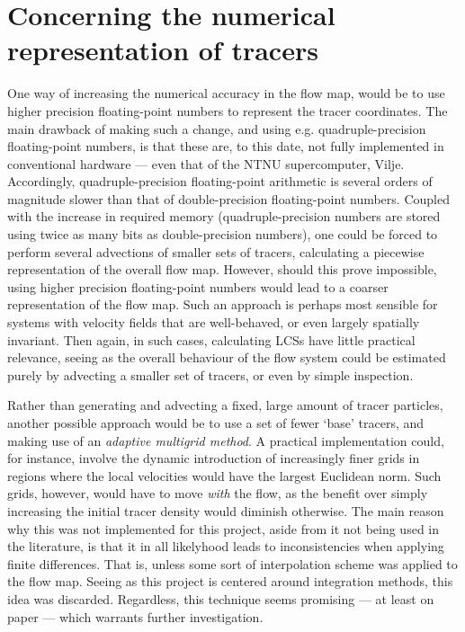 \section{Concerning the numerical representation of tracers}
\label{sec:concerning_the_numerical_representation_of_tracers}

One way of increasing the numerical accuracy in the flow map, would be
to use higher precision floating-point numbers to represent the tracer
coordinates. The main drawback of making such a change, and using e.g.
quadruple-precision floating-point numbers, is that these are, to this date,
not fully implemented in conventional hardware --- even that of the NTNU
supercomputer, Vilje. Accordingly, quadruple-precision floating-point
arithmetic is several orders of magnitude slower than that of double-precision
floating-point numbers. Coupled with the increase in required memory
(quadruple-precision numbers are stored using twice as many bits as
double-precision numbers), one could be forced to perform several
advections of smaller sets of tracers, calculating a piecewise representation
of the overall flow map. However, should this prove impossible, using higher
precision floating-point numbers would lead to a coarser representation
of the flow map. Such an approach is perhaps most sensible for systems with
velocity fields that are well-behaved, or even largely spatially invariant.
Then again, in such cases, calculating LCSs have little practical relevance,
seeing as the overall behaviour of the flow system could be estimated purely by
advecting a smaller set of tracers, or even by simple inspection.

Rather than generating and advecting a fixed, large amount of tracer particles,
another possible approach would be to use a set of fewer `base' tracers, and
making use of an \emph{adaptive multigrid method}. A practical implementation
could, for instance, involve the dynamic introduction of increasingly finer
grids in regions where the local velocities would have the largest Euclidean
norm. Such grids, however, would have to move \emph{with} the flow, as the
benefit over simply increasing the initial tracer density would diminish
otherwise. The main reason why this was not implemented for this project,
aside from it not being used in the literature, is that it in all likelyhood
leads to inconsistencies when applying finite differences. That is, unless some
sort of interpolation scheme was applied to the flow map. Seeing as this
project is centered around integration methods, this idea was discarded.
Regardless, this technique seems promising --- at least on paper --- which
warrants further investigation.
%
